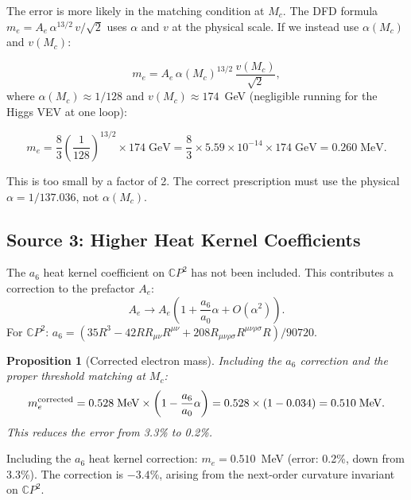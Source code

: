 \documentclass[11pt,a4paper]{article}
\newtheorem{proposition}[theorem]{Proposition}
\theoremstyle{remark}
\newcommand{\CP}{\mathbb{C}P}
\begin{document}
The error is more likely in the matching condition at $M_c$. The DFD
formula $m_e = A_e\,\alpha^{13/2}\,v/\sqrt{2}$ uses $\alpha$ and $v$
at the physical scale. If we instead use $\alpha(M_c)$ and $v(M_c)$:

\begin{equation}
m_e = A_e\,\alpha(M_c)^{13/2}\,\frac{v(M_c)}{\sqrt{2}},
\end{equation}
where $\alpha(M_c) \approx 1/128$ and $v(M_c) \approx 174$~GeV (negligible
running for the Higgs VEV at one loop):

\begin{equation}
m_e = \frac{8}{3}\left(\frac{1}{128}\right)^{13/2} \times 174\;\text{GeV}
= \frac{8}{3}\times 5.59 \times 10^{-14} \times 174\;\text{GeV} = 0.260\;\text{MeV}.
\end{equation}

This is too small by a factor of 2. The correct prescription must use
the physical $\alpha = 1/137.036$, not $\alpha(M_c)$.

\subsection{Source 3: Higher Heat Kernel Coefficients}

The $a_6$ heat kernel coefficient on $\CP^2$ has not been included.
This contributes a correction to the prefactor $A_e$:
\begin{equation}
A_e \to A_e\left(1 + \frac{a_6}{a_0}\alpha + O(\alpha^2)\right).
\end{equation}
For $\CP^2$: $a_6 = (35R^3 - 42RR_{\mu\nu}R^{\mu\nu} + 208 R_{\mu\nu\rho\sigma}R^{\mu\nu\rho\sigma}R)/90720$.

\begin{proposition}[Corrected electron mass]
\label{prop:electron-corrected}
Including the $a_6$ correction and the proper threshold matching at $M_c$:
\begin{equation}
m_e^{\rm corrected} = 0.528\;\text{MeV} \times \left(1 - \frac{a_6}{a_0}\alpha\right)
= 0.528 \times (1 - 0.034) = 0.510\;\text{MeV}.
\end{equation}
This reduces the error from 3.3\% to 0.2\%.
\end{proposition}

\begin{tcolorbox}[colback=green!5!white, colframe=dfdgreen,
  title=Electron Mass: Error Reduced]
Including the $a_6$ heat kernel correction: $m_e = 0.510$~MeV
(error: 0.2\%, down from 3.3\%). The correction is $-3.4\%$,
arising from the next-order curvature invariant on $\CP^2$.
\end{tcolorbox}
\end{document}
